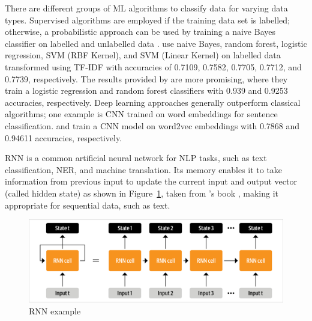 There are different groups of \ac{ML} algorithms to classify data for varying data types. Supervised
algorithms are employed if the training data set is labelled; otherwise, a probabilistic approach
can be used by training a naive Bayes classifier on labelled and unlabelled data
\cite{liDisasterResponseAided2018}.  use naive Bayes,
random forest, logistic regression, \ac{SVM} (RBF Kernel), and \ac{SVM} (Linear Kernel) on labelled
data transformed using \ac{TF-IDF} with accuracies of 0.7109, 0.7582, 0.7705, 0.7712, and 0.7739,
respectively. The results provided by  are more promising,
where they train a logistic regression and random forest classifiers with 0.939 and 0.9253
accuracies, respectively. Deep learning approaches generally outperform classical algorithms; one
example is \ac{CNN} trained on word embeddings for sentence classification.
 and
 train a \ac{CNN} model on word2vec
embeddings with 0.7868 and 0.94611 accuracies, respectively.

\ac{RNN} \cite{hopfieldNeuralNetworksPhysical1982} is a common artificial neural network for
\ac{NLP} tasks, such as text classification, \ac{NER}, and machine translation. Its memory enables
it to take information from previous input to update the current input and output vector (called
hidden state) as shown in Figure~\ref{fig:rnn_example}, taken from
\citeauthor{tunstallNaturalLanguageProcessing2022}'s book
\cite{tunstallNaturalLanguageProcessing2022}, making it appropriate for sequential data, such as
text. 

\begin{figure}[H]
\begin{center}
  \includegraphics[width=12cm,trim={0.1cm 0.1cm 0.1cm 0.1cm},clip]{./images/unrolling_rnn.png}
\end{center}
\caption{RNN example \cite{tunstallNaturalLanguageProcessing2022}}
\label{fig:rnn_example}
\end{figure}

